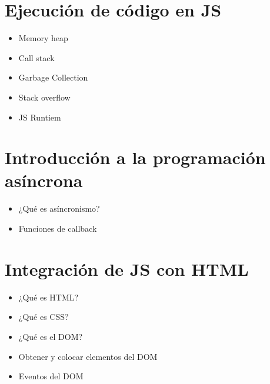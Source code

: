 \documentclass{./lib/temarioptc}
\begin{document}
\section{Ejecución de código en JS}
\begin{itemize}
	\item Memory heap
	\item Call stack
	\item Garbage Collection
	\item Stack overflow
	\item JS Runtiem
\end{itemize}

\section{Introducción a la programación asíncrona}
	\begin{itemize}
		\item ¿Qué es asíncronismo?
		\item Funciones de callback
	\end{itemize}

\section{Integración de JS con HTML}
\begin{itemize}
	\item ¿Qué es HTML?
	\item ¿Qué es CSS?
	\item ¿Qué es el DOM?
	\item Obtener y colocar elementos del DOM
	\item Eventos del DOM
\end{itemize}
\end{document}
